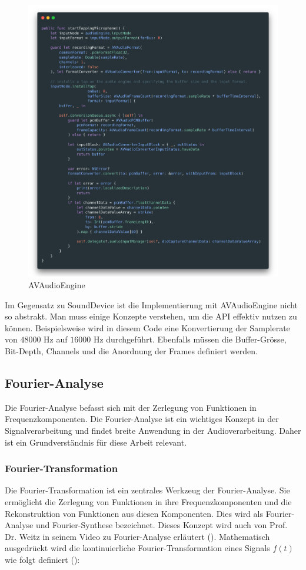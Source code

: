\documentclass[11pt,a4paper]{article}
\begin{document}
\begin{figure}[h]
	\centering
	\includegraphics[width=1.0\linewidth]{img/avaudioengine.png}
	\caption{AVAudioEngine}
	\label{fig:avaudioengine}
\end{figure}


\noindent \newline
Im Gegensatz zu SoundDevice ist die Implementierung mit AVAudioEngine nicht so abstrakt. Man muss
einige Konzepte verstehen, um die API effektiv nutzen zu können. Beispielsweise wird in diesem Code
eine Konvertierung der Samplerate von \(48000\) Hz auf \(16000\) Hz durchgeführt. Ebenfalls müssen 
die Buffer-Grösse, Bit-Depth, Channels und die Anordnung der Frames definiert werden.

\newpage \subsection{Fourier-Analyse}
Die Fourier-Analyse befasst sich mit der Zerlegung von Funktionen in Frequenzkomponenten. Die
Fourier-Analyse ist ein wichtiges Konzept in der Signalverarbeitung und findet breite Anwendung
in der Audioverarbeitung. Daher ist ein Grundverständnis für diese Arbeit relevant.

\subsubsection{Fourier-Transformation}
Die Fourier-Transformation ist ein zentrales Werkzeug der Fourier-Analyse. Sie ermöglicht die
Zerlegung von Funktionen in ihre Frequenzkomponenten und die Rekonstruktion von Funktionen aus
diesen Komponenten. Dies wird als Fourier-Analyse und Fourier-Synthese bezeichnet. Dieses Konzept
wird auch von Prof. Dr. Weitz in seinem Video zu Fourier-Analyse erläutert
(\cite[2:20]{weitz2023fourier}). Mathematisch ausgedrückt wird die kontinuierliche
Fourier-Transformation eines Signals \( f(t) \) wie folgt definiert
(\cite[Chapter~5]{hansen2014fourier}):
\end{document}
